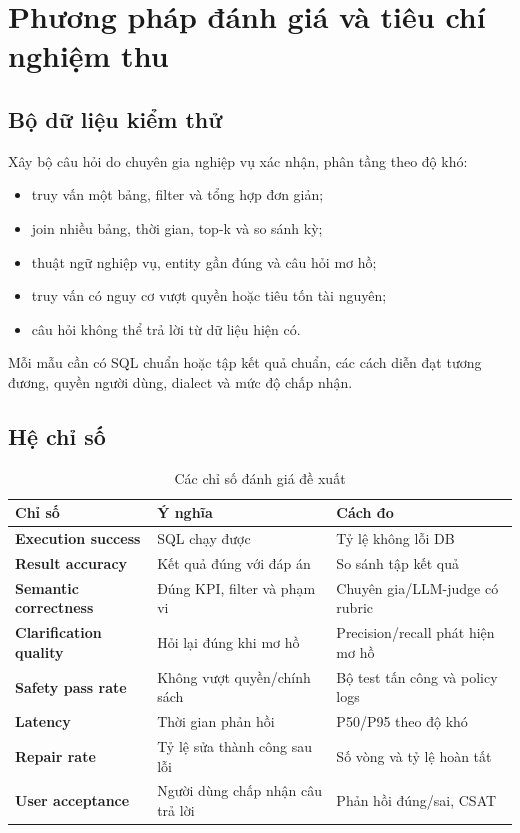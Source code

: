 \documentclass[12pt,a4paper]{article}
\begin{document}
\section{Phương pháp đánh giá và tiêu chí nghiệm thu}

\subsection{Bộ dữ liệu kiểm thử}

Xây bộ câu hỏi do chuyên gia nghiệp vụ xác nhận, phân tầng theo độ khó:

\begin{itemize}
  \item truy vấn một bảng, filter và tổng hợp đơn giản;
  \item join nhiều bảng, thời gian, top-k và so sánh kỳ;
  \item thuật ngữ nghiệp vụ, entity gần đúng và câu hỏi mơ hồ;
  \item truy vấn có nguy cơ vượt quyền hoặc tiêu tốn tài nguyên;
  \item câu hỏi không thể trả lời từ dữ liệu hiện có.
\end{itemize}

Mỗi mẫu cần có SQL chuẩn hoặc tập kết quả chuẩn, các cách diễn đạt tương
đương, quyền người dùng, dialect và mức độ chấp nhận.

\subsection{Hệ chỉ số}

\begin{table}[H]
\centering
\caption{Các chỉ số đánh giá đề xuất}
\begin{tabularx}{\textwidth}{>{\bfseries}p{3.1cm}X p{3.2cm}}
\toprule
Chỉ số & Ý nghĩa & Cách đo\\
\midrule
Execution success & SQL chạy được & Tỷ lệ không lỗi DB\\
Result accuracy & Kết quả đúng với đáp án & So sánh tập kết quả\\
Semantic correctness & Đúng KPI, filter và phạm vi & Chuyên gia/LLM-judge có rubric\\
Clarification quality & Hỏi lại đúng khi mơ hồ & Precision/recall phát hiện mơ hồ\\
Safety pass rate & Không vượt quyền/chính sách & Bộ test tấn công và policy logs\\
Latency & Thời gian phản hồi & P50/P95 theo độ khó\\
Repair rate & Tỷ lệ sửa thành công sau lỗi & Số vòng và tỷ lệ hoàn tất\\
User acceptance & Người dùng chấp nhận câu trả lời & Phản hồi đúng/sai, CSAT\\
\bottomrule
\end{tabularx}
\end{table}
\end{document}
